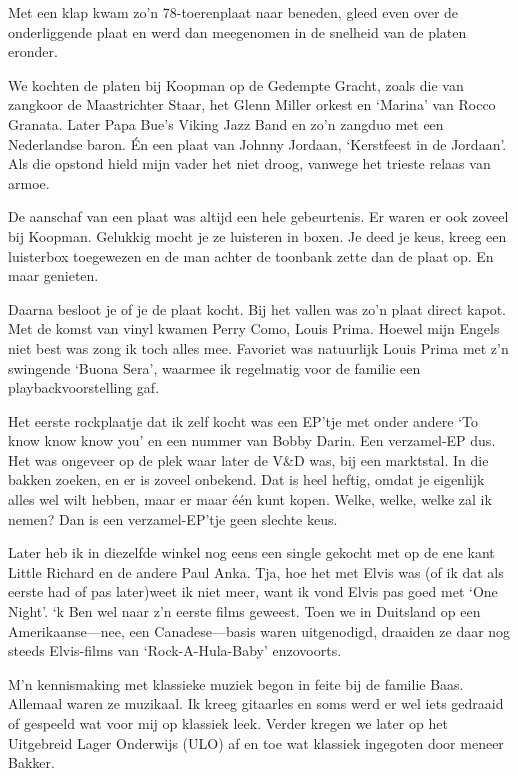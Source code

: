 \documentclass[12pt,twoside]{memoir}
\begin{document}
Met een klap kwam zo’n 78-toerenplaat naar beneden, gleed even over de onderliggende plaat en werd dan meegenomen in de snelheid van de platen eronder. 

We kochten de platen bij Koopman op de Gedempte Gracht, zoals die van zangkoor de Maastrichter Staar, het Glenn Miller orkest en `Marina' van Rocco Granata. Later Papa Bue’s Viking Jazz Band en zo’n zangduo met een Nederlandse baron. Én een plaat van Johnny Jordaan, ‘Kerstfeest in de Jordaan’. Als die opstond hield mijn vader het niet droog, vanwege het trieste relaas van armoe. 

De aanschaf van een plaat was altijd een hele gebeurtenis. Er waren er ook zoveel bij Koopman. Gelukkig mocht je ze luisteren in boxen. Je deed je keus, kreeg een luisterbox toegewezen en de man achter de toonbank zette dan de plaat op. En maar genieten. 

Daarna besloot je of je de plaat kocht. Bij het vallen was zo’n plaat direct kapot. Met de komst van vinyl kwamen Perry Como, Louis Prima. Hoewel mijn Engels niet best was zong ik toch alles mee. Favoriet was natuurlijk Louis Prima met z’n swingende `Buona Sera', waarmee ik regelmatig voor de familie een playbackvoorstelling gaf.


Het eerste rockplaatje dat ik zelf kocht was een EP'tje met onder andere `To know know know you' en een nummer van Bobby Darin. Een verzamel-EP dus. Het was ongeveer op de plek waar later de V\&D was, bij een marktstal. In die bakken zoeken, en er is zoveel onbekend. Dat is heel heftig, omdat je eigenlijk alles wel wilt hebben, maar er maar één kunt kopen. Welke, welke, welke zal ik nemen? Dan is een verzamel-EP'tje geen slechte keus.

Later heb ik in diezelfde winkel nog eens een single gekocht met op de ene kant Little Richard en de andere Paul Anka. Tja, hoe het met Elvis was (of ik dat als eerste had of pas later)weet ik niet meer, want ik vond Elvis pas goed met `One Night'. `k Ben wel naar z'n eerste films geweest. Toen we in Duitsland op een Amerikaanse---nee, een Canadese---basis waren uitgenodigd, draaiden ze daar nog steeds Elvis-films van `Rock-A-Hula-Baby' enzovoorts.

M’n kennismaking met klassieke muziek begon in feite bij de familie Baas. Allemaal waren ze muzikaal. Ik kreeg gitaarles en soms werd er wel iets gedraaid of gespeeld wat voor mij op klassiek leek. Verder kregen we later op het Uitgebreid Lager Onderwijs (ULO) af en toe wat klassiek ingegoten door meneer Bakker. 
\end{document}
